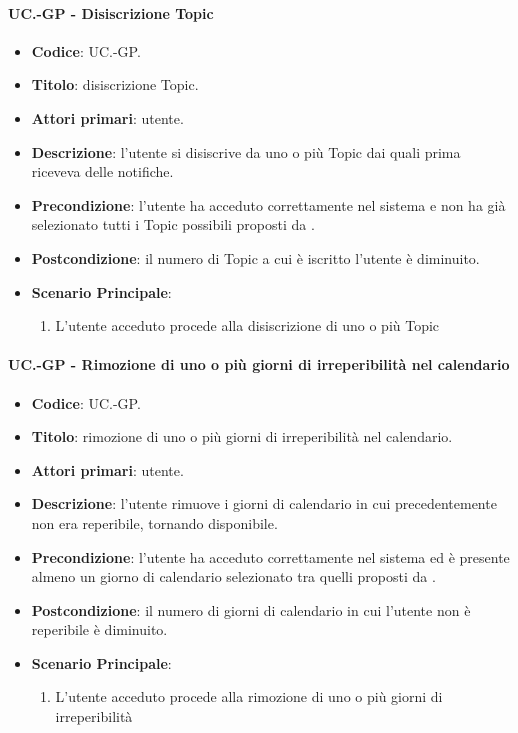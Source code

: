 	\paragraph{UC\theuccount.\thesubuccount-GP - Disiscrizione Topic}
		
		\begin{itemize}
			\item \textbf{Codice}: UC\theuccount.\thesubuccount-GP.
			\item \textbf{Titolo}: disiscrizione Topic.
			\item \textbf{Attori primari}: utente.
			\item \textbf{Descrizione}: l’utente si disiscrive da uno o più Topic dai quali prima riceveva delle notifiche.
			\item \textbf{Precondizione}: l’utente ha acceduto correttamente nel sistema e non ha già selezionato tutti i Topic possibili proposti da \progetto.
			\item \textbf{Postcondizione}: il numero di Topic a cui è iscritto l’utente è diminuito.
			\item \textbf{Scenario Principale}:
			\begin{enumerate}
				\item L'utente acceduto procede alla disiscrizione di uno o più Topic
			\end{enumerate}
		\end{itemize}
	
	\paragraph{UC\theuccount.\thesubuccount-GP - Rimozione di uno o più giorni di irreperibilità nel calendario}
	
	\begin{itemize}
		\item \textbf{Codice}: UC\theuccount.\thesubuccount-GP.
		\item \textbf{Titolo}: rimozione di uno o più giorni di irreperibilità nel calendario.
		\item \textbf{Attori primari}: utente.
		\item \textbf{Descrizione}: l’utente rimuove i giorni di calendario in cui precedentemente	non era reperibile, tornando disponibile.
		\item \textbf{Precondizione}: l’utente ha acceduto correttamente nel sistema ed è presente almeno un giorno di calendario selezionato tra quelli proposti da \progetto.
		\item \textbf{Postcondizione}: il numero di giorni di calendario in cui l’utente non è reperibile è diminuito.
		\item \textbf{Scenario Principale}:
		\begin{enumerate}
			\item L'utente acceduto procede alla rimozione di uno o più giorni di irreperibilità
		\end{enumerate}
	\end{itemize}
	
